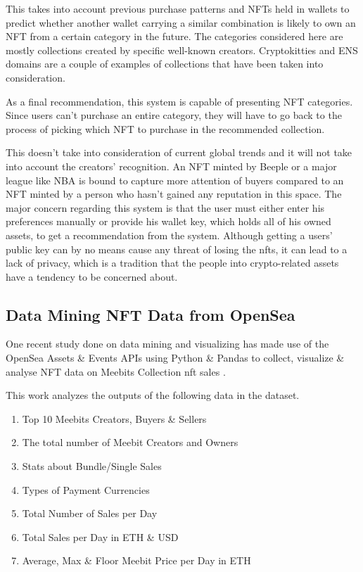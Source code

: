 \documentclass[conference]{IEEEtran}
\begin{document}
This takes into account previous purchase patterns and NFTs held in wallets to predict whether another wallet carrying a similar combination is likely to own an NFT from a certain category in the future. The categories considered here are mostly collections created by specific well-known creators. Cryptokitties and ENS domains are a couple of examples of collections that have been taken into consideration.

As a final recommendation, this system is capable of presenting NFT categories. Since users can't purchase an entire category, they will have to go back to the process of picking which NFT to purchase in the recommended collection.

This doesn't take into consideration of current global trends and it will not take into account the creators' recognition. An NFT minted by Beeple or a major league like NBA is bound to capture more attention of buyers compared to an NFT minted by a person who hasn't gained any reputation in this space. The major concern regarding this system is that the user must either enter his preferences manually or provide his wallet key, which holds all of his owned assets, to get a recommendation from the system. Although getting a users' public key can by no means cause any threat of losing the \gls{nft}s, it can lead to a lack of privacy, which is a tradition that the people into crypto-related assets have a tendency to be concerned about.


\subsection{Data Mining NFT Data from OpenSea}
One recent study done on data mining and visualizing has made use of the OpenSea Assets \& Events APIs using Python \& Pandas to collect, visualize \& analyse NFT data on Meebits Collection \autocite{larva_labs_meebits_nodate} \gls{nft} sales \autocite{adil_moujahid_data_2021}.

This work analyzes the outputs of the following data in the dataset.
\begin{enumerate}
\item Top 10 Meebits Creators, Buyers \& Sellers
\item The total number of Meebit Creators and Owners
\item Stats about Bundle/Single Sales
\item Types of Payment Currencies
\item Total Number of Sales per Day
\item Total Sales per Day in ETH \& USD
\item Average, Max \& Floor Meebit Price per Day in ETH
\end{enumerate}
\end{document}
